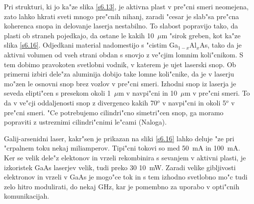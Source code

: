 Pri strukturi, ki jo ka"ze slika \ref{s6.13}, je aktivna plast v pre"cni
smeri neomejena, zato lahko hkrati sveti mnogo pre"cnih nihanj, zaradi
"cesar je slab"sa pre"cna koherenca snopa in delovanje laserja nestabilno.
To slabost popravijo tako, da plasti ob straneh pojedkajo, da ostane le
kakih 10~$\mu$m "sirok greben, kot ka"ze slika \ref{s6.16}. Odjedkani
material nadomestijo s "cistim Ga$_{1-x}$Al$_x$As, tako da je aktivni
volumen od vseh strani obdan s snovjo z ve"cjim lomnim koli"cnikom. S tem
dobimo pravokoten svetlobni vodnik, v katerem je ujet laserski snop. Ob
primerni izbiri dele"za aluminija dobijo take lomne koli"cnike, da je v
laserju mo"zen le osnovni snop brez vozlov v pre"cni smeri. Izhodni snop iz
laserja je seveda elipti"cen s presekom okoli 1~$\mu$m v navpi"cni in 10~$\mu
$m v pre"cni smeri. To da v ve"cji oddaljenosti snop z divergenco kakih 70$^o
$ v navpi"cni in okoli 5$^o$ v pre"cni smeri. "Ce potrebujemo cilindri"cno
simetri"cen snop, ga moramo popraviti z ustreznimi cilindri"cnimi le"cami
(Naloga).

Galij-arsenidni laser, kakr"sen je prikazan na sliki \ref{s6.16} lahko
deluje "ze pri "crpalnem toku nekaj miliamperov. Tipi"cni tokovi so med
50~mA in 100~mA. Ker se velik dele"z elektonov in vrzeli rekombinira s
sevanjem v aktivni plasti, je izkoristek GaAs laserjev velik, tudi preko 30%
10~mW. Zaradi velike gibljivosti elektronov in vrzeli v GaAs je mogo"ce tok
in s tem izhodno svetlobno mo"c tudi zelo hitro modulirati, do nekaj GHz,
kar je pomembno za uporabo v opti"cnih komunikacijah.
